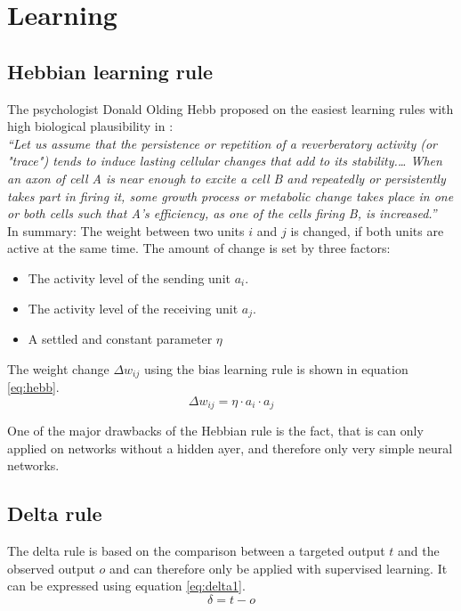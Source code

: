 \documentclass[10pt,a4paper,DIV=11]{scrreprt}
\begin{document}
\chapter{Learning}\label{ch:learning}
\section{Hebbian learning rule}
The psychologist Donald Olding Hebb proposed on the easiest learning rules with high biological plausibility in \cite{HEBB}:\\

\textit{“Let us assume that the persistence or repetition of a reverberatory activity (or "trace") tends to induce lasting cellular changes that add to its stability.… When an axon of cell A is near enough to excite a cell B and repeatedly or persistently takes part in firing it, some growth process or metabolic change takes place in one or both cells such that A's efficiency, as one of the cells firing B, is increased.”}\\

In summary: The weight between two units $i$ and $j$ is changed, if both units are active at the same time. The amount of change is set by three factors:

\begin{itemize}
\item The activity level of the sending unit $a_i$.
\item The activity level of the receiving unit $a_j$.
\item A settled and constant parameter $\eta$
\end{itemize}

The weight change $\Delta w_{ij}$ using the bias learning rule is shown in equation \eqref{eq:hebb}.
\begin{equation}
\Delta w_{ij} = \eta \cdot a_i \cdot a_j
\label{eq:hebb}
\end{equation}

One of the major drawbacks of the Hebbian rule is the fact, that is can only applied on networks without a hidden ayer, and therefore only very simple neural networks.

\section{Delta rule}
The delta rule is based on the comparison between a targeted output $t$ and the observed output $o$ and can therefore only be applied with supervised learning.
It can be expressed using equation \eqref{eq:delta1}.
\begin{equation}
\delta = t - o
\label{eq:delta1}
\end{equation}
\end{document}
